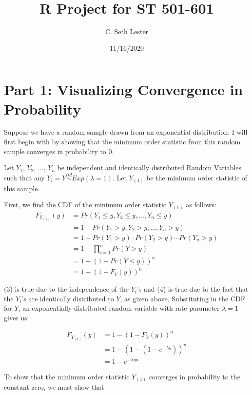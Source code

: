 \documentclass[
]{article}
\title{R Project for ST 501-601}
\author{C. Seth Lester}
\date{11/16/2020}
\begin{document}
\maketitle

\hypertarget{part-1-visualizing-convergence-in-probability}{%
\section{Part 1: Visualizing Convergence in
Probability}\label{part-1-visualizing-convergence-in-probability}}

Suppose we have a random sample drawn from an exponential distribution.
I will first begin with by showing that the minimum order statistic from
this random sample converges in probability to 0.

Let $Y_1$, $Y_2$, $\ldots$, $Y_n$ be independent and identically distributed Random Variables such that any $Y_i = Y \overset{iid}{\sim} Exp(\lambda = 1)$. Let $Y_{(1)}$ be the minimum order statistic of this sample.

First, we find the CDF of the minimum order statistic $Y_{(1)}$ as follows:
\begin{align}
F_{Y_{(1)}}(y) &= Pr(Y_1 \leq y, Y_2 \leq y, \ldots, Y_n \leq y) \\
              &= 1 - Pr(Y_1 > y, Y_2 > y, \ldots, Y_n > y)  \\
              &= 1 - Pr(Y_1 > y) \cdot Pr(Y_2 > y) \cdots Pr(Y_n > y) \\
              &= 1 - \prod_{i = 1}^{n} Pr(Y > y) \\
              &= 1 - (1 - Pr(Y \leq y))^{n} \\
              &= 1 - (1 - F_{Y}(y))^{n}
\end{align}

(3) is true due to the independence of the $Y_i$'s and (4) is true due to the fact that the $Y_i$'s are identically distributed to $Y$, as given above. Substituting in the CDF for $Y$, an exponentially-distributed random variable with rate parameter $\lambda = 1$ gives us:

\begin{align}
F_{Y_{(1)}}(y) &= 1 - (1 - F_{Y}(y))^{n} \\
  &= 1 - (1 - (1 - e^{- \lambda y}))^{n} \\
  &= 1 - e^{- \lambda yn}
\end{align}

To show that the minimum order statistic $Y_{(1)}$ converges in probability to the constant zero, we must show that
\end{document}
